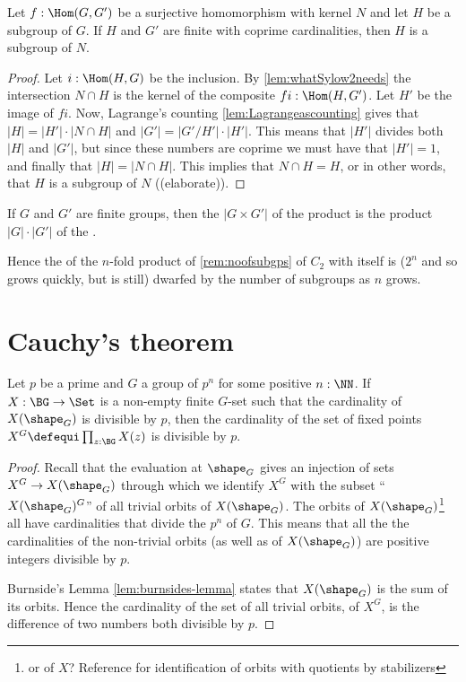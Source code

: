 \begin{corollary}
  \label{cor:whatSylow2needs}Let $f:\Hom(G,G')$ be a surjective homomorphism with kernel $N$ and let $H$ be a subgroup of $G$.  If $H$ and $G'$ are finite with coprime cardinalities, then $H$ is a subgroup of $N$.
\end{corollary}
\begin{proof}
  Let $i:\Hom(H,G)$ be the inclusion.  By \cref{lem:whatSylow2needs} the intersection $N\cap H$ is the kernel of the composite $fi:\Hom(H,G')$.  Let $H'$ be the image of $fi$. Now, Lagrange's counting \cref{lem:Lagrangeascounting} gives that $|H|=|H'|\cdot |N\cap H|$ and $|G'|=|G'/H'|\cdot|H'|$.  This means that $|H'|$ divides both $|H|$ and $|G'|$, but since these numbers are coprime we must have that $|H'|=1$, and finally that $|H|=|N\cap H|$.  This implies that $N\cap H=H$, or in other words, that $H$ is a subgroup of $N$ ((elaborate)).
\end{proof}

\begin{corollary}
  If $G$ and $G'$ are finite groups, then the \gporder $|G\times G'|$ of the product is the product $|G|\cdot| G'|$ of the \gporders.
\end{corollary}
\begin{remark}
  Hence the \gporder of the $n$-fold product of \cref{rem:noofsubgps} of $C_2$ with itself is ($2^n$ and so grows quickly, but is still) dwarfed by the number of subgroups as $n$ grows.
\end{remark}


\section{Cauchy's theorem}
\begin{lemma}
  \label{lem:fixedptsize}
  Let $p$ be a prime and $G$ a group of \gporder $p^n$ for some positive $n:\NN$.  If $X:\BG\to\Set$ is a non-empty finite $G$-set such that the cardinality of $X(\shape_G)$ is divisible by $p$, then the cardinality of the set of fixed points $X^G\defequi\prod_{z:\BG}X(z)$ is divisible by $p$.
\end{lemma}
\begin{proof}
  Recall that the evaluation at $\shape_G$ gives an injection of sets $X^G\to X(\shape_G)$ through which we identify $X^G$ with the subset ``$X(\shape_G)^G$'' of all trivial orbits of $X(\shape_G)$.
 The orbits of $X(\shape_G)$\footnote{or of $X$?  Reference for identification of orbits with quotients by stabilizers} all have cardinalities that divide the \gporder $p^n$ of $G$.
This means that all the the cardinalities of the non-trivial orbits (as well as of $X(\shape_G)$) are positive integers divisible by $p$.

 Burnside's Lemma \cref{lem:burnsides-lemma} states that $X(\shape_G)$ is the sum of its orbits.
Hence the cardinality of the set of all trivial orbits, \ie of $X^G$, is the difference of two numbers both divisible by $p$.
\end{proof}

